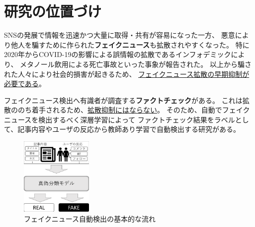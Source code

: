 
\section{研究の位置づけ}

SNSの発展で情報を迅速かつ大量に取得・共有が容易になった一方、
悪意により他人を騙すために作られた\textbf{フェイクニュース}も拡散されやすくなった。
特に2020年からCOVID-19の影響による誤情報の拡散であるインフォデミックにより、
メタノール飲用による死亡事故\cite{iraninfo}といった事象が報告された。
以上から騙された人々により社会的損害が起きるため、
\underline{フェイクニュース拡散の早期抑制が必要である}\cite{snsinfo}。

フェイクニュース検出へ有識者が調査する\textbf{ファクトチェック}がある。
これは拡散ののち着手されるため、\underline{拡散抑制にはならない}。
そのため、自動でフェイクニュースを検出するべく深層学習によって
ファクトチェック結果をラベルとして、記事内容やユーザの反応から教師あり学習で自動検出する研究がある\cite{Wang:2018:EEA:3219819.3219903}。


\setlength\intextsep{0pt}
\setlength\textfloatsep{0pt}
\begin{figure}
    \vspace{-5mm}
    \centering
    \includegraphics[width=0.31\textwidth]{figs/base_model.pdf}
    \vspace{-1cm} 
    \caption{フェイクニュース自動検出の基本的な流れ}
    \label{fig:objects}
\end{figure}

